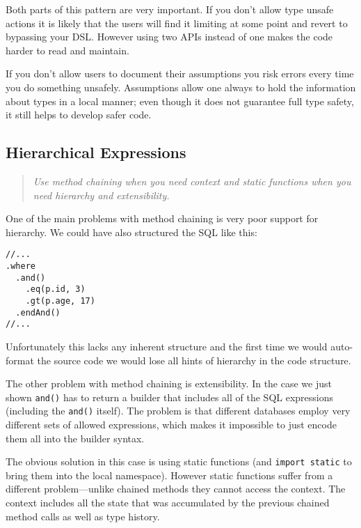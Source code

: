 \documentclass{sig-alternate}
\begin{document}
Both parts of this pattern are very important. If you don't allow type unsafe actions it is likely that the users will find it limiting at some point and revert to bypassing your DSL. However using two APIs instead of one makes the code harder to read and maintain.

If you don't allow users to document their assumptions you risk errors every time you do something unsafely. Assumptions allow one always to hold the information about types in a local manner; even though it does not guarantee full type safety, it still helps to develop safer code.

\subsection{Hierarchical Expressions}

\begin{quote}
\emph{Use method chaining when you need context and static functions when you need hierarchy and extensibility.}
\end{quote}

One of the main problems with method chaining is very poor support for hierarchy. We could have also structured the SQL like this:
\begin{verbatim}
//...
.where
  .and()
    .eq(p.id, 3)
    .gt(p.age, 17)
  .endAnd()
//...  
\end{verbatim}
Unfortunately this lacks any inherent structure and the first time we would auto-format the source code we would lose all hints of hierarchy in the code structure.

The other problem with method chaining is extensibility. In the case we just shown \verb!and()! has to return a builder that includes all of the SQL expressions (including the \verb!and()! itself). The problem is that different databases employ very different sets of allowed expressions, which makes it impossible to just encode them all into the builder syntax.

The obvious solution in this case is using static functions (and \verb!import static! to bring them into the local namespace). However static functions suffer from a different problem---unlike chained methods they cannot access the context. The context includes all the state that was accumulated by the previous chained method calls as well as type history. 
\end{document}
